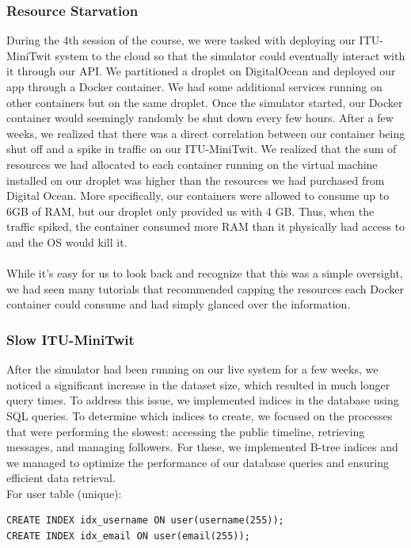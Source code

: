 \documentclass{article}
\begin{document}
\subsubsection{Resource Starvation}
During the 4th session of the course, we were tasked with deploying our ITU-MiniTwit system to the cloud so that the simulator could eventually interact with it through our API. We partitioned a droplet on DigitalOcean and deployed our app through a Docker container. We had some additional services running on other containers but on the same droplet. Once the simulator started, our Docker container would seemingly randomly be shut down every few hours. After a few weeks, we realized that there was a direct correlation between our container being shut off and a spike in traffic on our ITU-MiniTwit. We realized that the sum of resources we had allocated to each container running on the virtual machine installed on our droplet was higher than the resources we had purchased from Digital Ocean. More specifically, our containers were allowed to consume up to 6GB of RAM, but our droplet only provided us with 4 GB. Thus, when the traffic spiked, the container consumed more RAM than it physically had access to and the OS would kill it.
\\\\
While it's easy for us to look back and recognize that this was a simple oversight, we had seen many tutorials that recommended capping the resources each Docker container could consume and had simply glanced over the information.

\subsubsection{Slow ITU-MiniTwit}
After the simulator had been running on our live system for a few weeks, we noticed a significant increase in the dataset size, which resulted in much longer query times. To address this issue, we implemented indices in the database using SQL queries. To determine which indices to create, we focused on the processes that were performing the slowest: accessing the public timeline, retrieving messages, and managing followers. For these, we implemented B-tree indices and we managed to optimize the performance of our database queries and ensuring efficient data retrieval.
\\
For user table (unique):
\begin{verbatim}
CREATE INDEX idx_username ON user(username(255));
CREATE INDEX idx_email ON user(email(255));
\end{verbatim}
\end{document}
